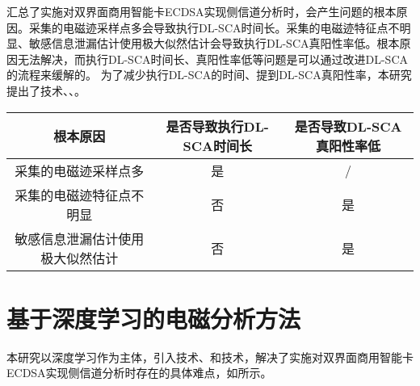 {	{\color{\xchange}
		
	汇总了实施对双界面商用智能卡ECDSA实现侧信道分析时，会产生问题的根本原因。采集的电磁迹采样点多会导致执行DL-SCA时间长。采集的电磁迹特征点不明显、敏感信息泄漏估计使用极大似然估计会导致执行DL-SCA真阳性率低。根本原因无法解决，而执行DL-SCA时间长、真阳性率低等问题是可以通过改进DL-SCA的流程来缓解的。%
	为了减少执行DL-SCA的时间、提到DL-SCA真阳性率，本研究提出了\yuchuli 技术、\shujuzengqiang、\jiashejianyanguji。
	
	\begin{table}[!h]
		\label{tab:problemset}
		\centering
		\scriptsize%
		\begin{tabular}{c|cc}
			\hline
			根本原因&是否导致执行DL-SCA时间长&是否导致DL-SCA真阳性率低\\
			\hline
			采集的电磁迹采样点多&是&/\\
			采集的电磁迹特征点不明显&否&是\\
			敏感信息泄漏估计使用极大似然估计&否&是\\
			\hline
		\end{tabular}
	\end{table}

	\section{基于深度学习的电磁分析方法}\label{sec:solution}
	{\color{\xchange}
		
		本研究以深度学习作为主体，引入\yuchuli 技术、\shujuzengqiang 和\jiashejianyanguji 技术，解决了实施对双界面商用智能卡ECDSA实现侧信道分析时存在的具体难点，如所示。
		
}}}
